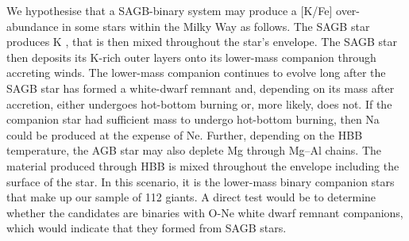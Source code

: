\documentclass[a4paper,fleqn,usenatbib]{mnras}
\newcommand{\todo}[1]{\textcolor{red}{#1}}
\begin{document}
We hypothesise that a SAGB-binary system may produce a [K/Fe] over-abundance in some stars within the Milky Way as follows. The SAGB star produces K \citep[destroying Na in the process;][]{prantzos2017}, that is then mixed throughout the star's envelope. The SAGB star then deposits its K-rich outer layers onto its lower-mass companion through accreting winds. The lower-mass companion continues to evolve long after the SAGB star has formed a white-dwarf remnant and, depending on its mass after accretion, either undergoes hot-bottom burning or, more likely, does not. If the companion star had sufficient mass to undergo hot-bottom burning, then Na could be produced \citep{prantzos2017} at the expense of Ne. Further, depending on the HBB temperature, the AGB star may also deplete Mg through Mg--Al chains. The material produced through HBB is mixed throughout the envelope including the surface of the star. In this scenario, it is the lower-mass binary companion stars that make up our sample of 112 giants. A direct test would be to determine whether the candidates are binaries with O-Ne white dwarf remnant companions, which would indicate that they formed from SAGB stars.




\end{document}
